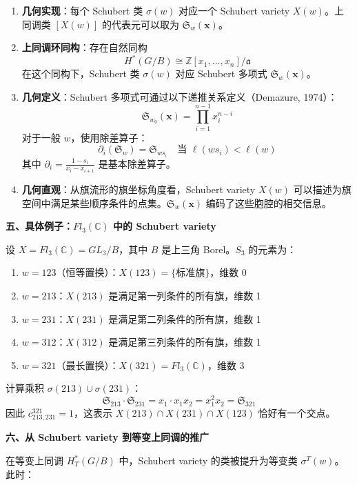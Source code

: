 \begin{enumerate}
\item \textbf{几何实现}：每个 Schubert 类 $\sigma(w)$ 对应一个 Schubert variety $X(w)$。上同调类 $[X(w)]$ 的代表元可以取为 $\mathfrak{S}_w(\mathbf{x})$。

\item \textbf{上同调环同构}：存在自然同构
$$H^*(G/B) \cong \mathbb{Z}[x_1, \ldots, x_n] / \mathfrak{a}$$
在这个同构下，Schubert 类 $\sigma(w)$ 对应 Schubert 多项式 $\mathfrak{S}_w(\mathbf{x})$。

\item \textbf{几何定义}：Schubert 多项式可通过以下递推关系定义（Demazure, 1974）：
$$\mathfrak{S}_{w_0}(\mathbf{x}) = \prod_{i=1}^{n-1} x_i^{n-i}$$
对于一般 $w$，使用除差算子：
$$\partial_i(\mathfrak{S}_w) = \mathfrak{S}_{ws_i} \quad \text{当 } \ell(ws_i) < \ell(w)$$
其中 $\partial_i = \frac{1 - s_i}{x_i - x_{i+1}}$ 是基本除差算子。

\item \textbf{几何直观}：从旗流形的旗坐标角度看，Schubert variety $X(w)$ 可以描述为旗空间中满足某些顺序条件的点集。$\mathfrak{S}_w(\mathbf{x})$ 编码了这些胞腔的相交信息。
\end{enumerate}

\textbf{五、具体例子：$Fl_3(\mathbb{C})$ 中的 Schubert variety}

设 $X = Fl_3(\mathbb{C}) = GL_3/B$，其中 $B$ 是上三角 Borel。$S_3$ 的元素为：

\begin{enumerate}
\item $w = 123$（恒等置换）：$X(123) = \{ \text{标准旗}\}$，维数 0
\item $w = 213$：$X(213)$ 是满足第一列条件的所有旗，维数 1
\item $w = 231$：$X(231)$ 是满足第二列条件的所有旗，维数 1
\item $w = 312$：$X(312)$ 是满足第三列条件的所有旗，维数 1
\item $w = 321$（最长置换）：$X(321) = Fl_3(\mathbb{C})$，维数 3
\end{enumerate}

计算乘积 $\sigma(213) \cup \sigma(231)$：
$$\mathfrak{S}_{213} \cdot \mathfrak{S}_{231} = x_1 \cdot x_1 x_2 = x_1^2 x_2 = \mathfrak{S}_{321}$$
因此 $c_{213,231}^{321} = 1$，这表示 $X(213) \cap X(231) \cap X(123)$ 恰好有一个交点。

\textbf{六、从 Schubert variety 到等变上同调的推广}

在等变上同调 $H_T^*(G/B)$ 中，Schubert variety 的类被提升为等变类 $\sigma^T(w)$。此时：

